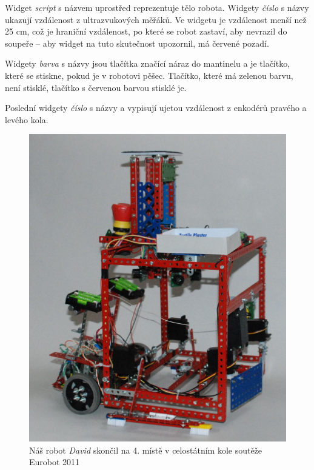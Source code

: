 \documentclass[12pt, a4paper, oneside]{article}
\newcommand{\It}{\textit}  %
\begin{document}
Widget \It{script} s názvem  uprostřed reprezentuje tělo robota. Widgety \It{číslo} s názvy  ukazují vzdálenost z ultrazvukových měřáků. Ve widgetu  je vzdálenost menší než 25 cm, což je hraniční vzdálenost, po které se robot zastaví, aby nevrazil do soupeře -- aby widget na tuto skutečnost upozornil, má červené pozadí.

Widgety \It{barva} s názvy  jsou tlačítka značící náraz do mantinelu a  je tlačítko, které se stiskne, pokud je v robotovi pěšec. Tlačítko, které má zelenou barvu, není stisklé, tlačítko s červenou barvou stisklé je.

Poslední widgety \It{číslo} s názvy  a  vypisují ujetou vzdálenost z enkodérů pravého a levého kola.

\begin{figure}[H]
\begin{center}
\includegraphics[scale=0.24]{img/use_david_robot.jpg}
\caption{Náš robot \It{David} skončil na 4. místě v celostátním kole soutěže Eurobot 2011}
\end{center}
\end{figure}
\end{document}
